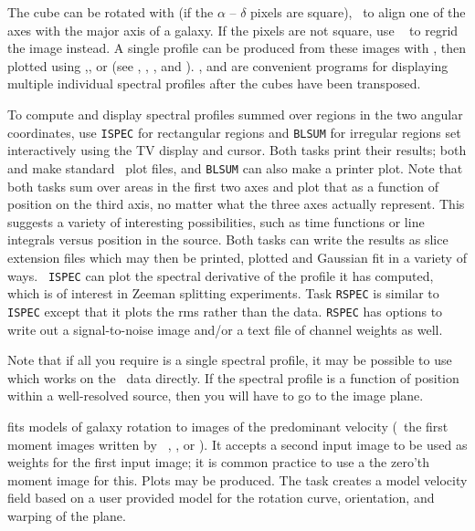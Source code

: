      The cube can be rotated with {\tt {}} (if the $\alpha$
-- $\delta$ pixels are square), \eg\ to align one of the axes with the
major axis of a galaxy.  If the pixels are not square, use {\tt
{}} to regrid the image instead.  A single profile can be
produced from these images with {\tt {}}, then plotted using
{\tt {}},{\tt {}}, or {\tt {}} (see
, , , and ).
{\tt {}}, {\tt {}} and {\tt {}} are
convenient programs for displaying multiple individual spectral
profiles after the cubes have been transposed.

     To compute and display spectral profiles summed over regions in
the two angular coordinates, use {\tt ISPEC} for rectangular regions
and {\tt BLSUM} for irregular regions set interactively using the TV
display and cursor.  Both tasks print their results; both {\tt
{}} and {\tt {}} make standard \AIPS\ plot files,
and {\tt BLSUM} can also make a printer plot.  Note that both tasks
sum over areas in the first two axes and plot that as a function of
position on the third axis, no matter what the three axes actually
represent.  This suggests a variety of interesting possibilities, such
as time functions or line integrals versus position in the source.
Both tasks can write the results as slice extension files which may
then be printed, plotted and Gaussian fit in a variety of ways.  {\tt
ISPEC} can plot the spectral derivative of the profile it has
computed, which is of interest in Zeeman splitting experiments.  Task
{\tt RSPEC} is similar to {\tt ISPEC} except that it plots the rms
rather than the data.  {\tt RSPEC} has options to write out a
signal-to-noise image and/or a text file of channel weights as
well.

     Note that if all you require is a single spectral profile, it may
be possible to use {\tt {}} which works on the \uv\ data
directly. If the spectral profile is a function of position within a
well-resolved source, then you will have to go to the image plane.

    {\tt {}} fits models of galaxy rotation to images of the
predominant velocity (\eg\ the first moment images written by {\tt
{}}, {\tt {}}, or {\tt {}}).  It accepts
a second input image to be used as weights for the first input image;
it is common practice to use a the zero'th moment image for this.
Plots may be produced.  The task {\tt {}} creates a model
velocity field based on a user provided model for the rotation curve,
orientation, and warping of the plane.

